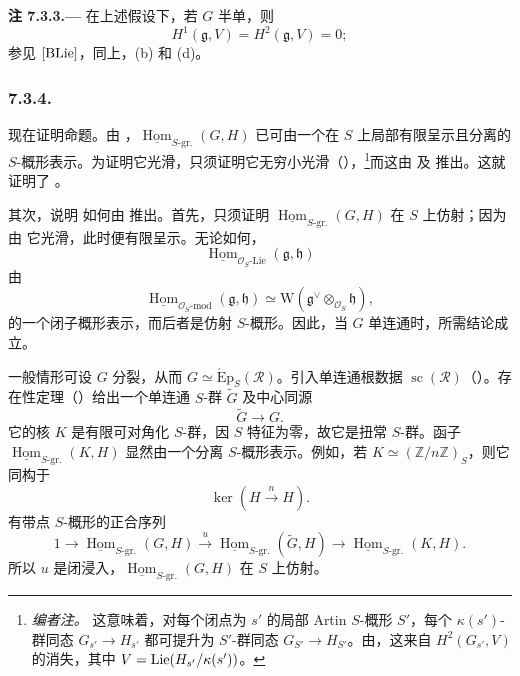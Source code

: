 \par\medskip\noindent{}\textbf{注 7.3.3.---}\enspace
在上述假设下，若 \(G\) 半单，则
\[
  H^1(\mathfrak g,V)=H^2(\mathfrak g,V)=0;
\]
参见 \([{\rm BLie}]\)，同上，(b) 和 (d)。

\subsubsection*{7.3.4.}
现在证明命题。由 ，\(\underline{\operatorname{Hom}}_{S\text{-}\mathrm{gr.}}(G,H)\) 已可由一个在 \(S\) 上局部有限呈示且分离的 \(S\)-概形表示。为证明它光滑，只须证明它无穷小光滑（），\footnote{\textit{编者注。} 这意味着，对每个闭点为 \(s'\) 的局部 Artin \(S\)-概形 \(S'\)，每个 \(\kappa(s')\)-群同态 \(G_{s'}\to H_{s'}\) 都可提升为 \(S'\)-群同态 \(G_{S'}\to H_{S'}\)。由，这来自 \(H^2(G_{s'},V)\) 的消失，其中 \(V=\operatorname{Lie}(H_{s'}/\kappa(s'))\)。}而这由 及  推出。这就证明了 。

其次，说明  如何由  推出。首先，只须证明 \(\underline{\operatorname{Hom}}_{S\text{-}\mathrm{gr.}}(G,H)\) 在 \(S\) 上仿射；因为由  它光滑，此时便有限呈示。无论如何，
\[
  \underline{\operatorname{Hom}}_{\mathcal O_S\text{-}\mathrm{Lie}}
    (\mathfrak g,\mathfrak h)
\]
由
\[
  \underline{\operatorname{Hom}}_{\mathcal O_S\text{-}\mathrm{mod}}
    (\mathfrak g,\mathfrak h)
  \simeq
  \mathrm W\!\left(
    \mathfrak g^\vee\otimes_{\mathcal O_S}\mathfrak h
  \right),
\]
的一个闭子概形表示，而后者是仿射 \(S\)-概形。因此，当 \(G\) 单连通时，所需结论成立。

一般情形可设 \(G\) 分裂，从而 \(G\simeq\operatorname{\acute Ep}_S(\mathscr R)\)。引入单连通根数据 \(\operatorname{sc}(\mathscr R)\)（）。存在性定理（）给出一个单连通 \(S\)-群 \(\widetilde G\) 及中心同源
\[
  \widetilde G\longrightarrow G.
\]
它的核 \(K\) 是有限可对角化 \(S\)-群，因 \(S\) 特征为零，故它是扭常 \(S\)-群。函子 \(\underline{\operatorname{Hom}}_{S\text{-}\mathrm{gr.}}(K,H)\) 显然由一个分离 \(S\)-概形表示。例如，若 \(K\simeq(\mathbb Z/n\mathbb Z)_S\)，则它同构于
\[
  \ker\!\left(H\xrightarrow{\,n\,}H\right).
\]
有带点 \(S\)-概形的正合序列
\[
  1\longrightarrow
  \underline{\operatorname{Hom}}_{S\text{-}\mathrm{gr.}}(G,H)
  \xrightarrow{u}
  \underline{\operatorname{Hom}}_{S\text{-}\mathrm{gr.}}
    (\widetilde G,H)
  \longrightarrow
  \underline{\operatorname{Hom}}_{S\text{-}\mathrm{gr.}}(K,H).
\]
所以 \(u\) 是闭浸入，\(\underline{\operatorname{Hom}}_{S\text{-}\mathrm{gr.}}(G,H)\) 在 \(S\) 上仿射。

